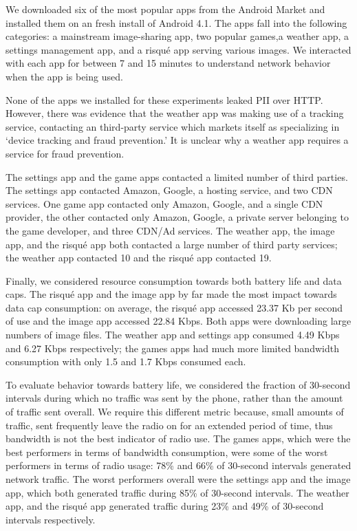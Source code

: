        We downloaded six of the most popular apps from the Android Market and installed them on an fresh install of Android 4.1.
       The apps fall into the following categories: a mainstream image-sharing app, two popular games,a weather app, a settings 
        management app, and a risqu\'{e} app serving various images. We interacted with each app for between 7 and 15 minutes 
        to understand network behavior when the app is being used.

    None of the apps we installed for these experiments leaked PII over HTTP. However, there was evidence that the weather app was making use of a tracking service, contacting an third-party service which markets itself as specializing in `device tracking and fraud prevention.'
    It is unclear why a weather app requires a service for fraud prevention.

    The settings app and the game apps contacted a limited number of third parties.
    The settings app contacted Amazon, Google, a hosting service, and two CDN services.
    One game app contacted only Amazon, Google, and a single CDN provider, the other contacted only Amazon, Google, a private server belonging to the game developer, and three CDN/Ad services.
    The weather app, the image app, and the risqu\'{e} app both contacted a large number of third party services; the weather app contacted 10 and the risqu\'{e} app contacted 19. 

   Finally, we considered resource consumption towards both battery life and data caps.
    The risqu\'{e} app and the image app by far made the most impact towards data cap consumption: on average, the risqu\'{e} app accessed 23.37 Kb per second of use and the image app accessed 22.84 Kbps.
    Both apps were downloading large numbers of image files.
    The weather app and settings app consumed 4.49 Kbps and 6.27 Kbps respectively; the games apps had much more limited bandwidth consumption with only 1.5 and 1.7 Kbps consumed each.

    To evaluate behavior towards battery life, we considered the fraction of 30-second intervals during which no traffic was sent by the phone, rather than the amount of traffic sent overall. 
    We require this different metric because, \eg{} small amounts of traffic, sent frequently leave the radio on for an extended period of time, thus bandwidth is not the best indicator of radio use.
    The games apps, which were the best performers in terms of bandwidth consumption, were some of the worst performers in terms of radio usage: 78\% and 66\% of 30-second intervals generated network traffic.
    The worst performers overall were the settings app and the image app, which both generated traffic during 85\% of 30-second intervals.
    The weather app, and the risqu\'{e} app generated traffic during 23\% and 49\% of 30-second intervals respectively.

